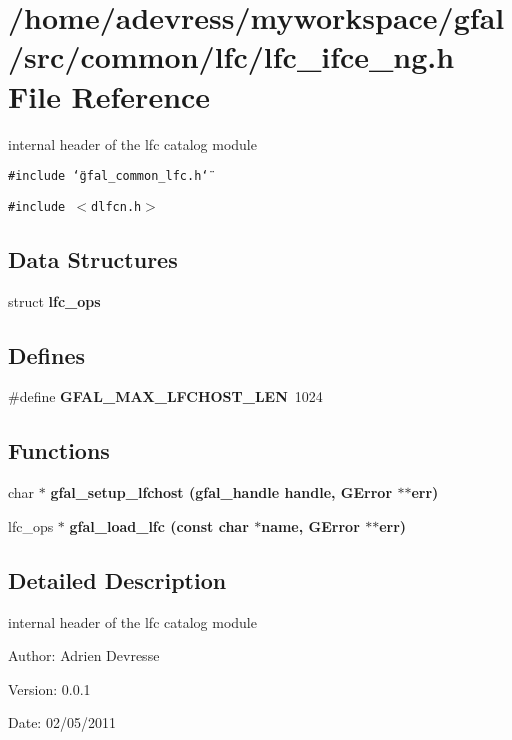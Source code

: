 \section{/home/adevress/myworkspace/gfal/src/common/lfc/lfc\_\-ifce\_\-ng.h File Reference}
\label{lfc__ifce__ng_8h}
internal header of the lfc catalog module 

{\tt \#include \char`\"{}gfal\_\-common\_\-lfc.h\char`\"{}}\par
{\tt \#include $<$dlfcn.h$>$}\par
\subsection*{Data Structures}
\begin{CompactItemize}
\item 
struct \textbf{lfc\_\-ops}
\end{CompactItemize}
\subsection*{Defines}
\begin{CompactItemize}
\item 
\#define \textbf{GFAL\_\-MAX\_\-LFCHOST\_\-LEN}~1024\label{lfc__ifce__ng_8h_4ba01f362057d237e7234f527da40cdb}

\end{CompactItemize}
\subsection*{Functions}
\begin{CompactItemize}
\item 
char $\ast$ \bf{gfal\_\-setup\_\-lfchost} (gfal\_\-handle handle, GError $\ast$$\ast$err)
\item 
lfc\_\-ops $\ast$ \bf{gfal\_\-load\_\-lfc} (const char $\ast$name, GError $\ast$$\ast$err)
\end{CompactItemize}


\subsection{Detailed Description}
internal header of the lfc catalog module 

\begin{Desc}
\item[Author:]Adrien Devresse \end{Desc}
\begin{Desc}
\item[Version:]0.0.1 \end{Desc}
\begin{Desc}
\item[Date:]02/05/2011 \end{Desc}


